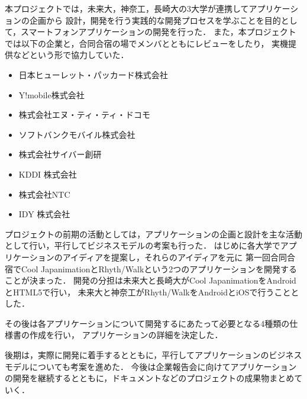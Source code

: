 \par
本プロジェクトでは，未来大，神奈工，長崎大の3大学が連携してアプリケーションの企画から
設計，開発を行う実践的な開発プロセスを学ぶことを目的として，スマートフォンアプリケーションの開発を行った．
また，本プロジェクトでは以下の企業と，合同合宿の場でメンバとともにレビューをしたり，
実機提供などという形で協力していた．
\begin{itemize}
\item 日本ヒューレット・パッカード株式会社
\item Y!mobile株式会社
\item 株式会社エヌ・ティ・ティ・ドコモ
\item ソフトバンクモバイル株式会社
\item 株式会社サイバー創研
\item KDDI 株式会社
\item 株式会社NTC
\item IDY 株式会社
\end{itemize}

プロジェクトの前期の活動としては，アプリケーションの企画と設計を主な活動として行い，平行してビジネスモデルの考案も行った．
はじめに各大学でアプリケーションのアイディアを提案し，それらのアイディアを元に
第一回合同合宿でCool JapanimationとRhyth/Walkという2つのアプリケーションを開発することが決まった．
開発の分担は未来大と長崎大がCool JapanimationをAndroidとHTML5で行い，
未来大と神奈工がRhyth/WalkをAndroidとiOSで行うこととした．

その後は各アプリケーションについて開発するにあたって必要となる4種類の仕様書の作成を行い，
アプリケーションの詳細を決定した．
\par
後期は，実際に開発に着手するとともに，平行してアプリケーションのビジネスモデルについても考案を進めた．
今後は企業報告会に向けてアプリケーションの開発を継続するとともに，ドキュメントなどのプロジェクトの成果物まとめていく．
